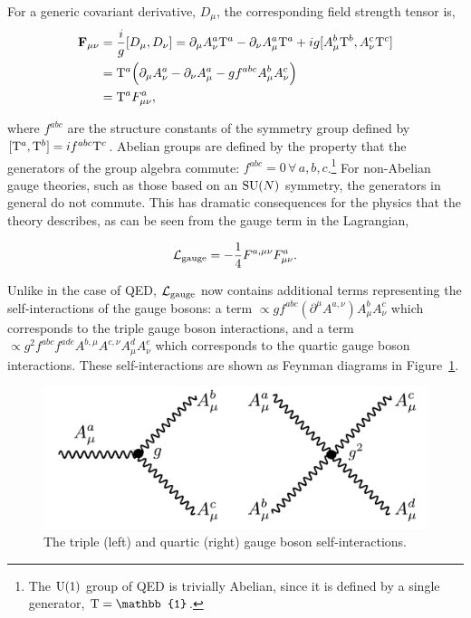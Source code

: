 For a generic covariant derivative, $D_\mu$, the corresponding field strength tensor is,
\begin{equation}
\begin{split}
    \mathbf{F}_{\mu\nu} &= \frac{i}{g}[D_\mu,D_\nu] = \partial_\mu A^a_\nu {\rm{T}}^a - \partial_\nu A^a_\mu {\rm{T}}^a + ig[A^b_\mu {\rm{T}}^b,A^c_\nu {\rm{T}}^c]
    \\
    &= {\rm{T}}^a \Big( \partial_\mu A^a_\nu-\partial_\nu A^a_\mu-gf^{abc}A^b_\mu A^c_\nu \Big) 
    \\
    &= {\rm{T}}^a F^a_{\mu\nu},
\end{split}
\end{equation}

\noindent
where $f^{abc}$ are the structure constants of the symmetry group defined by ${[{\rm{T}}^a,{\rm{T}}^b]=if^{abc}{\rm{T}}^c}$. Abelian groups are defined by the property that the generators of the group algebra commute: $f^{abc}=0\, \forall\, a,b,c$.\footnote{The ${\rm{U}}(1)$ group of QED is trivially Abelian, since it is defined by a single generator, ${\rm{T}}=\mathbb{1}$.} For non-Abelian gauge theories, such as those based on an ${\rm{SU}}(N)$ symmetry, the generators in general do not commute. This has dramatic consequences for the physics that the theory describes, as can be seen from the gauge term in the Lagrangian,

\begin{equation}
    \mathcal{L}_{\rm{gauge}} = -\frac{1}{4}F^{a,\mu\nu}F^a_{\mu\nu}.
\end{equation}

\noindent
Unlike in the case of QED, $\mathcal{L}_{\rm{gauge}}$ now contains additional terms representing the self-interactions of the gauge bosons: a term $\propto gf^{abc}(\partial^{\mu} A^{a,\nu})A^b_{\mu}A^c_\nu$ which corresponds to the triple gauge boson interactions, and a term $\propto g^2f^{abc}f^{ade}A^{b,\mu}A^{c,\nu}A^d_{\mu}A^e_\nu$ which corresponds to the quartic gauge boson interactions. These self-interactions are shown as Feynman diagrams in Figure~\ref{fig:gauge_selfinteraction}.

\begin{figure}
  \centering
  \includegraphics[width=.6\linewidth]{Figures/theory/gauge_self_interaction.pdf}
  \caption[The gauge boson self-interactions]
  {
    The triple (left) and quartic (right) gauge boson self-interactions.
  }
  \label{fig:gauge_selfinteraction}
\end{figure}


